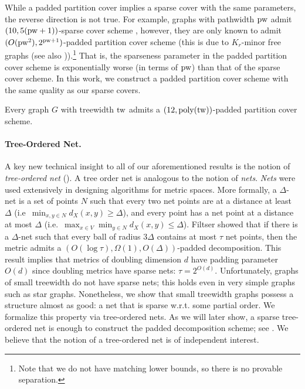\documentclass{theoretics}
\newcommand{\tw}{{\rm tw}}
\newcommand{\pw}{{\rm pw}}
\newcommand{\poly}{\mathrm{poly}}
\begin{document}
While a padded partition cover implies a sparse cover with the same parameters, the reverse direction is not true. For example, graphs with pathwidth $\pw$ admit $(10,5(\pw+1))$-sparse cover scheme \cite{Fil20}, however, they are only known to admit  $(O(\pw^2),2^{\pw+1})$-padded partition cover scheme (this is due to $K_r$-minor free graphs \cite{KPR93,FT03} (see also \cite{KLMN04,Fil20})).\footnote{Note that we do not have matching lower bounds, so there is no provable separation.} That is, the sparseness parameter in the padded partition cover scheme is exponentially worse (in terms of $\pw$) than that of the sparse cover scheme. In this work, we construct a padded partition cover scheme with the same quality as our sparse covers.

\begin{theorem}\label{thm:PaddedPartitionCoverTW}
	Every graph $G$ with treewidth $\tw$ admits a  $\left(12,\poly(\tw)\right)$-padded partition cover scheme. 
\end{theorem}

\paragraph*{Tree-Ordered Net.} A key new technical insight to all of our aforementioned results is the notion of \emph{tree-ordered net} (). A tree order net is analogous to the notion of \emph{nets}. \emph{Nets} were used extensively in designing algorithms for metric spaces. More formally, a $\Delta$-net is a set of points $N$ such that every two net points are at a distance at least $\Delta$ (i.e~$\min_{x,y\in N}d_X(x,y)\ge\Delta$), and every point has a net point at a distance at most $\Delta$ (i.e.~$\max_{x\in V}\min_{y\in N}d_X(x,y)\le\Delta$). Filtser \cite{Fil19Approx} showed that if there is a $\Delta$-net such that every ball of radius $3\Delta$ contains at most $\tau$ net points, then the metric admits a $\left(O(\log\tau),\Omega(1),O(\Delta)\right)$-padded decomposition. This result implies that metrics of doubling dimension $d$  have padding parameter $O(d)$ since doubling metrics have sparse nets: $\tau = 2^{O(d)}$. Unfortunately, graphs of small treewidth do not have sparse nets; this holds even in very simple graphs such as star graphs. Nonetheless, we show that small treewidth graphs possess a structure almost as good: a net that is sparse w.r.t. some partial order. We formalize this property via tree-ordered nets.  As we will later show, a sparse tree-ordered net is enough to construct the padded decomposition scheme; see . We believe that the notion of a tree-ordered net is of independent interest.
\end{document}
